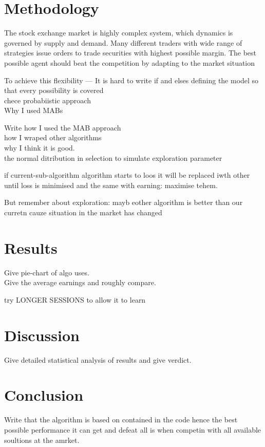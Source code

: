 \documentclass{llncs}
\begin{document}
\section{Methodology}
The stock exchange market is highly complex system, which dynamics is governed by supply and demand. Many different traders with wide range of strategies issue orders to trade securities with highest possible margin. The best possible agent should beat the competition by adapting to the market situation

To achieve this flexibility --- It is hard to write if and elses defining the model so that every possibility is covered\\
chece probabiistic approach\\




Why I used MABs

Write how I used the MAB approach\\
  how I wraped other algorithms\\
  why I think it is good.\\

the normal ditribution in selection to simulate exploration parameter


if current-sub-algorithm algorithm starts to loos it will be replaced iwth other until loss is minimised and the same with earning: maximise tehem.

But remember about exploration: mayb eother algorithm is better than our curretn cauze situation in the market has changed

\section{Results}
Give pie-chart of algo uses.\\

Give the average earnings and roughly compare.

try LONGER SESSIONS to allow it to learn

\section{Discussion}

Give detailed statistical analysis of results and give verdict.

\section{Conclusion}
Write that the algorithm is based on contained in the code hence the best possible performance it can get and defeat all is when competin with all available soultions at the amrket.
\end{document}
